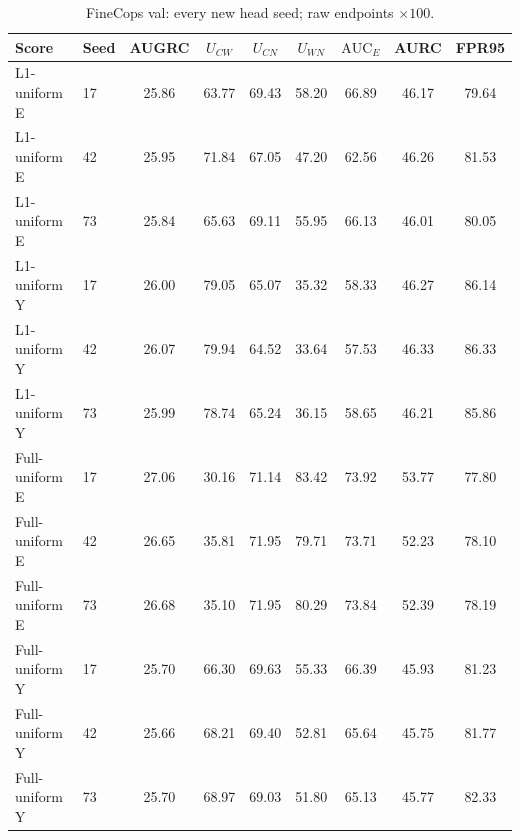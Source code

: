 \begin{table}[t]
\centering\footnotesize
\setlength{\tabcolsep}{3pt}
\renewcommand{\arraystretch}{1.15}
\caption{FineCops val: every new head seed; raw endpoints $\times100$.}\label{tab:coverage_seeds_finecops_val}
\begin{tabular}{@{}llccccccc@{}}\toprule
Score & Seed & AUGRC & $U_{CW}$ & $U_{CN}$ & $U_{WN}$ & $\mathrm{AUC}_E$ & AURC & FPR95\\\midrule
L1-uniform E & 17 & 25.86 & 63.77 & 69.43 & 58.20 & 66.89 & 46.17 & 79.64\\
L1-uniform E & 42 & 25.95 & 71.84 & 67.05 & 47.20 & 62.56 & 46.26 & 81.53\\
L1-uniform E & 73 & 25.84 & 65.63 & 69.11 & 55.95 & 66.13 & 46.01 & 80.05\\
L1-uniform Y & 17 & 26.00 & 79.05 & 65.07 & 35.32 & 58.33 & 46.27 & 86.14\\
L1-uniform Y & 42 & 26.07 & 79.94 & 64.52 & 33.64 & 57.53 & 46.33 & 86.33\\
L1-uniform Y & 73 & 25.99 & 78.74 & 65.24 & 36.15 & 58.65 & 46.21 & 85.86\\
Full-uniform E & 17 & 27.06 & 30.16 & 71.14 & 83.42 & 73.92 & 53.77 & 77.80\\
Full-uniform E & 42 & 26.65 & 35.81 & 71.95 & 79.71 & 73.71 & 52.23 & 78.10\\
Full-uniform E & 73 & 26.68 & 35.10 & 71.95 & 80.29 & 73.84 & 52.39 & 78.19\\
Full-uniform Y & 17 & 25.70 & 66.30 & 69.63 & 55.33 & 66.39 & 45.93 & 81.23\\
Full-uniform Y & 42 & 25.66 & 68.21 & 69.40 & 52.81 & 65.64 & 45.75 & 81.77\\
Full-uniform Y & 73 & 25.70 & 68.97 & 69.03 & 51.80 & 65.13 & 45.77 & 82.33\\
\bottomrule\end{tabular}
\end{table}
